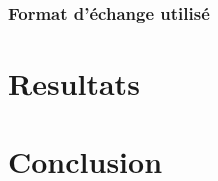       \subsubsection{Format d'échange utilisé}
      \label{subsubsec:main-automatic_evaluation_of_keyphrase_annotation-methodology-data_format-final_format}
        \TODO{\dots}


  \section{Resultats}
  \label{sec:main-automatic_evaluation_of_keyphrase_annotation-results}
    


    \TODO{\dots}


  \section{Conclusion}
  \label{sec:main-automatic_evaluation_of_keyphrase_annotation-Conclusion}

